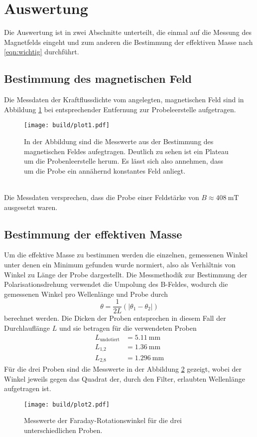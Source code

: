 \newpage
\section{Auswertung}
Die Auswertung ist in zwei Abschnitte unterteilt, die einmal auf die Messung des Magnetfelds eingeht und zum 
anderen die Bestimmung der effektiven Masse nach \eqref{eqn:wichtig} durchführt. 
\subsection{Bestimmung des magnetischen Feld}
Die Messdaten der Kraftflussdichte vom angelegten, magnetischen Feld sind in Abbildung \ref{fig:mag}
bei entsprechender Entfernung zur Probeleerstelle aufgetragen.
\begin{figure}
    \centering
    \texttt{[image: build/plot1.pdf]}
    \caption{In der Abbildung sind die Messwerte aus der Bestimmung des magnetischen Feldes aufegtragen. 
            Deutlich zu sehen ist ein Plateau um die Probenleerstelle herum. Es lässt sich also annehmen, dass
            um die Probe ein annähernd konstantes Feld anliegt.}
    \label{fig:mag}
\end{figure}
\\
Die Messdaten versprechen, dass die Probe einer Feldstärke von 
    $B \approx \SI{408}{\milli\tesla}$
ausgesetzt waren.

\subsection{Bestimmung der effektiven Masse}
Um die effektive Masse zu bestimmen werden die einzelnen, gemessenen Winkel unter denen ein Minimum gefunden wurde
normiert, also als Verhältnis von Winkel zu Länge der Probe dargestellt. 
Die Messmethodik zur Bestimmung der Polarisationsdrehung verwendet die Umpolung des B-Feldes, wodurch die gemessenen Winkel pro Wellenlänge und Probe durch 
\begin{equation}
\theta = \frac{1}{2L} (|\theta_1 - \theta_2|)
\end{equation}
berechnet werden. Die Dicken der Proben entsprechen in diesem Fall der Durchlauflänge $L$ und sie betragen für die verwendeten Proben
\begin{align*}
L_{\text{undotiert}} &= \SI{5.11}{\milli\meter}\\
L_{1\text{,}2} &= \SI{1.36}{\milli\meter} \\
L_{2\text{,}8} &= \SI{1.296}{\milli\meter}
\end{align*}
Für die drei Proben sind die Messwerte in der Abbildung \ref{fig:maf2} gezeigt, wobei der Winkel 
jeweils gegen das Quadrat der, durch den Filter, erlaubten Wellenlänge aufgetragen ist.
\begin{figure}
    \centering
    \texttt{[image: build/plot2.pdf]}
    \caption{Messwerte der Faraday-Rotationswinkel für die drei unterschiedlichen Proben. }
    \label{fig:maf2}
\end{figure}

